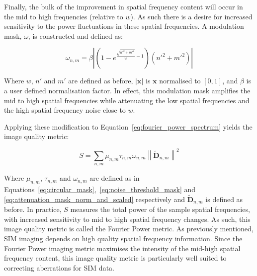 Finally, the bulk of the improvement in spatial frequency content will
occur in the mid to high frequencies (relative to $w$). As such there is 
a desire for increased sensitivity to the power fluctuations in these 
spatial frequencies. A modulation mask, $\omega$, is constructed and 
defined as:

\begin{equation}\label{eq:attenuation_mask_norm_and_scaled}
\omega_{n,m} = \beta \left| \left(1 - e^{\frac{\sqrt{n'^{2} + m'^{2}}}{w}-1}\right) \left(n'^{2} + m'^{2}\right) \right|
\end{equation}

Where $w$, $n'$ and $m'$ are defined as before, $\left| \textbf{x} \right|$ 
is $\textbf{x}$ normalised to $[0,1]$, and $\beta$ is a user defined 
normalisation factor. In effect, this modulation mask amplifies the mid 
to high spatial frequencies while attenuating the low spatial frequencies 
and the high spatial frequency noise close to $w$.

Applying these modification to Equation~\ref{eq:fourier_power_spectrum} 
yields the image quality metric:

\begin{equation}\label{eq:Fourier_power_metric}
S = \sum\limits_{n,m}{\mu_{n,m}\tau_{n,m}\omega_{n,m}\left\| \tilde{\textbf{D}}_{n,m} \right\|^2}
\end{equation}

Where $\mu_{n,m}$, $\tau_{n,m}$ and $\omega_{n,m}$ are defined as in
Equations~\ref{eq:circular_mask},~\ref{eq:noise_threshold_mask} and
\ref{eq:attenuation_mask_norm_and_scaled} respectively and 
$\tilde{\textbf{D}}_{n,m}$ is defined as before. In practice, $S$
measures the total power of the sample spatial frequencies, with 
increased sensitivity to mid to high spatial frequency changes. As
such, this image quality metric is called the Fourier Power metric.
As previously mentioned, SIM imaging depends on high quality spatial 
frequency information.\cite{debarre2008adaptive,thomas2015enhanced} 
Since the Fourier Power imaging metric maximises the intensity of 
the mid-high spatial frequency content, this image quality metric 
is particularly well suited to correcting aberrations for SIM data.
